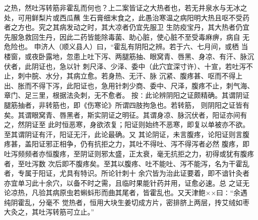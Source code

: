 \documentclass[a4paper,12pt,UTF8,twoside]{ctexbook}
\begin{document}
之热，然吐泻转筋非霍乱而何也？上二案皆证之大热者也，若无井泉水与无冰之处，可用鲜梨片或西瓜蘸 
生石膏细末食之，此愚治寒温之病阳明大热且呕不受药者之方也。究之其病发动之时，其大凉者仍宜先服卫 
生防疫宝丹，其大热者仍宜先服急救回生丹，因此二药皆能除毒菌、助心脏，使心脏不至受毒麻痹，病自 
无危险也。 
申济人（顺义县人）曰，“霍乱有阴阳之辨。若于六、七月间，或栖 
当楼窗，或夜卧露地，忽患上吐下泻、两腿筋抽、眼窝青、唇黑、身凉、有汗、脉沉伏者，此阴证也，急以针 
刺尺泽、少泽、委中（此穴宜深寸许）、十宣，若吐泻不止，刺中脘、水分，其病立愈。若身热、无汗、脉 
沉紧、腹疼甚、呕而不得上出、胀而不得下泻，此阳证也，急用针刺少商、委中、尺泽，腹疼不止，刺气海、 
章门、足三里，根据法灸刺，无不愈者。 
按∶此论辨阴阳之证颇精确。其谓阴证腿筋抽者，非转筋也，即《伤寒论》所谓四肢拘急也。若转筋， 
则阴阳之证皆有矣。其谓眼窝青、唇黑者，斯实阴证之明征。其谓身凉、脉沉伏者，阳证亦间有之，然阴证至 
此时恒恶寒，身欲浓复；阳证则始终不恶寒，即复以单被亦不欲。至其谓阴证有汗，阳证无汗，此论最确。又 
其论阴证，未言腹疼，论阳证则言腹疼甚，盖阳证邪正相争，仍有抗拒之力，其吐不得吐、泻不得泻者必然 
腹疼，即吐泻频频者亦恒腹疼，至阴证则邪太盛，正太衰，毫无抗拒之力，初得或犹有腹疼者，至吐泻数 
次后即不腹疼矣。至其以腹疼、吐不能吐、泻不能泻，名为干霍乱者，专属于阳证，尤具有特识。所论针刺十 
余穴皆为治此证要着，即不谙针灸者亦宜单习此十余穴，以备不时之需，且临时果能针药并用，证愈必速。总 
之证无论凉热，凡验其病原虫若蝌蚪形而曲其尾者，皆霍乱也。又天津鲍××曰∶“余遇纯阴霍乱，分毫不 
觉热者，恒用大块生姜切成方片，密排脐上两层，抟艾绒如枣大灸之，其吐泻转筋可立止。” 
\end{document}
